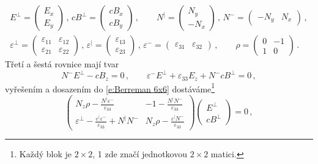 \begin{align} \label{e:Berreman 6x6}
E^\perp = \begin{pmatrix}E_x \\ E_y\end{pmatrix}
\,, \, cB^\perp = \begin{pmatrix}cB_x \\ cB_y\end{pmatrix}
\,, \qquad N^\vert = \begin{pmatrix} N_y \\ -N_x \end{pmatrix}
\,, \, N^- = \begin{pmatrix} -N_y & N_x\end{pmatrix} 
\,, \\ \varepsilon^\perp=\begin{pmatrix}\varepsilon_{11} & \varepsilon_{12} \\ \varepsilon_{21} & \varepsilon_{22}\end{pmatrix} 
\,, \, \varepsilon^\vert=\begin{pmatrix} \varepsilon_{13} \\ \varepsilon_{23} \end{pmatrix}
\,, \, \varepsilon^-=\begin{pmatrix} \varepsilon_{31} & \varepsilon_{32} \end{pmatrix}
\,, \qquad \rho = \begin{pmatrix}0 & -1 \\ 1 & 0\end{pmatrix}
\,.
\end{align}
Třetí a šestá rovnice mají tvar
\begin{equation}
N^- E^\perp - cB_z=0 \,, \qquad \varepsilon^- E^\perp + \varepsilon_{33} E_z + N^- cB^\perp=0 \,,
\end{equation}
vyřešením a dosazením do \eqref{e:Berreman 6x6} dostáváme\footnote{Každý blok je $2\times 2$, 1 zde značí jednotkovou $2\times 2$ matici.}
\begin{equation}
\begin{pmatrix}
N_z \rho -\frac{N^\vert \varepsilon^-}{\varepsilon_{33}} & -1 - \frac{N^\vert N^- }{\varepsilon_{33}} \\
\varepsilon^\perp-\frac{\varepsilon^\vert \varepsilon^-}{\varepsilon_{33}}+N^\vert N^- & N_z \rho - \frac{\varepsilon^\vert N^-}{\varepsilon_{33}}
\end{pmatrix} 
\begin{pmatrix} E^\perp \\ cB^\perp \end{pmatrix} = 0 \,,
\end{equation}
